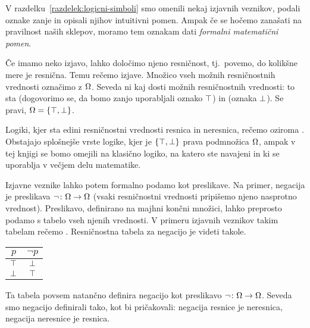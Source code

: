                 V razdelku~\ref{razdelek:logicni-simboli} smo omenili nekaj izjavnih veznikov, podali oznake zanje in opisali njihov intuitivni pomen. Ampak če se hočemo zanašati na pravilnost naših sklepov, moramo tem oznakam dati \emph{formalni matematični pomen}.

                Če imamo neko izjavo, lahko določimo njeno resničnost, tj.~povemo, do kolikšne mere je resnična. Temu rečemo  izjave. Množico vseh možnih resničnostnih vrednosti označimo z $\Omega$. Seveda ni kaj dosti možnih resničnostnih vrednosti: to sta  (dogovorimo se, da bomo zanjo uporabljali oznako $\top$) in  (oznaka $\bot$). Se pravi, $\tvs = \set{\true, \false}$.

                \begin{opomba}
                        Logiki, kjer sta edini resničnostni vrednosti resnica in neresnica, rečemo  oziroma . Obstajajo splošnejše vrste logike, kjer je $\set{\true, \false}$ prava podmnožica $\Omega$, ampak v tej knjigi se bomo omejili na klasično logiko, na katero ste navajeni in ki se uporablja v večjem delu matematike.
                \end{opomba}


                Izjavne veznike lahko potem formalno podamo kot preslikave. Na primer, negacija je preslikava $\lnot\colon \Omega \to \Omega$ (vsaki resničnostni vrednosti pripišemo njeno nasprotno vrednost). Preslikavo, definirano na majhni končni množici, lahko preprosto podamo s tabelo vseh njenih vrednosti. V primeru izjavnih veznikov takim tabelam rečemo . Resničnostna tabela za negacijo je videti takole.
                \begin{center}
                        \begin{tabular}{c|c}
                                $p$ & $\lnot{p}$ \\
                                \hline
                                $\top$ & $\bot$ \\
                                $\bot$ & $\top$
                        \end{tabular}
                \end{center}
                Ta tabela povsem natančno definira negacijo kot preslikavo $\lnot\colon \Omega \to \Omega$. Seveda smo negacijo definirali tako, kot bi pričakovali: negacija resnice je neresnica, negacija neresnice je resnica.

